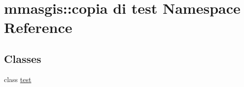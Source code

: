 \hypertarget{namespacemmasgis_1_1copia_01di_01test}{
\section{mmasgis::copia di test Namespace Reference}
\label{namespacemmasgis_1_1copia_01di_01test}
}
\subsection*{Classes}
\begin{DoxyCompactItemize}
\item 
class \hyperlink{classmmasgis_1_1copia_01di_01test_1_1test}{test}
\end{DoxyCompactItemize}
